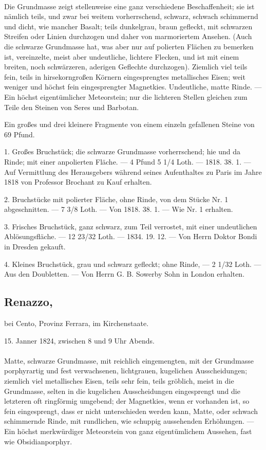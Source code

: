 \documentclass[a4paper, 11pt, oneside, polutonikogreek, german]{article}
\begin{document}
\paragraph{}
Die Grundmasse zeigt stellenweise eine ganz verschiedene Beschaffenheit; sie ist nämlich teils, und zwar bei weitem vorherrschend, schwarz, schwach schimmernd und dicht, wie mancher Basalt; teils dunkelgrau, braun gefleckt, mit schwarzen Streifen oder Linien durchzogen und daher von marmoriertem Ansehen. (Auch die schwarze Grundmasse hat, was aber nur auf polierten Flächen zu bemerken ist, vereinzelte, meist aber undeutliche, lichtere Flecken, und ist mit einem breiten, noch schwärzeren, aderigen Geflechte durchzogen). Ziemlich viel teils fein, teils in hirsekorngroßen Körnern eingesprengtes metallisches Eisen; weit weniger und höchst fein eingesprengter Magnetkies. Undeutliche, matte Rinde. — Ein höchst eigentümlicher Meteorstein; nur die lichteren Stellen gleichen zum Teile den Steinen von Seres und Barbotan.

Ein großes und drei kleinere Fragmente von einem einzeln gefallenen Steine von 69 Pfund.

1. Großes Bruchstück; die schwarze Grundmasse vorherrschend; hie und da Rinde; mit einer anpolierten Fläche. — 4 Pfund 5 1/4 Loth. — 1818. 38. 1. — Auf Vermittlung des Herausgebers während seines Aufenthaltes zu Paris im Jahre 1818 von Professor Brochant zu Kauf erhalten.

2. Bruchstücke mit polierter Fläche, ohne Rinde, von dem Stücke Nr. 1 abgeschnitten. — 7 3/8 Loth. — Von 1818. 38. 1. — Wie Nr. 1 erhalten.

3. Frisches Bruchstück, ganz schwarz, zum Teil verrostet, mit einer undeutlichen Ablösungsfläche. — 12 23/32 Loth. — 1834. 19. 12. — Von Herrn Doktor Bondi in Dresden gekauft.

4. Kleines Bruchstück, grau und schwarz gefleckt; ohne Rinde, — 2 1/32 Loth. — Aus den Doubletten. — Von Herrn G. B. Sowerby Sohn in London erhalten.
\subsection[Renazzo.]{Renazzo,}
\begin{center}
\small
bei Cento, Provinz Ferrara, im Kirchenstaate.

15. Janner 1824, zwischen 8 und 9 Uhr Abends.
\end{center}
\paragraph{}
Matte, schwarze Grundmasse, mit reichlich eingemengten, mit der Grundmasse porphyrartig und fest verwachsenen, lichtgrauen, kugelichen Ausscheidungen; ziemlich viel metallisches Eisen, teils sehr fein, teils gröblich, meist in die Grundmasse, selten in die kugelichen Ausscheidungen eingesprengt und die letzteren oft ringförmig umgebend; der Magnetkies, wenn er vorhanden ist, so fein eingesprengt, dass er nicht unterschieden werden kann, Matte, oder schwach schimmernde Rinde, mit rundlichen, wie schuppig aussehenden Erhöhungen. — Ein höchst merkwürdiger Meteorstein von ganz eigentümlichem Aussehen, fast wie Obsidianporphyr.
\end{document}
